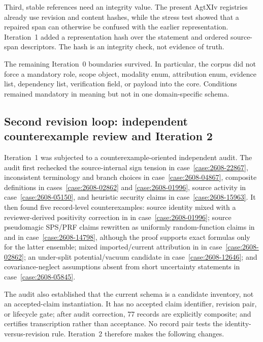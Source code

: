 Third, stable references need an integrity value. The present AgtXIv registries already use revision and content hashes, while the stress test showed that a repaired span can otherwise be confused with the earlier representation. Iteration~1 added a representation hash over the statement and ordered source-span descriptors. The hash is an integrity check, not evidence of truth.

The remaining Iteration~0 boundaries survived. In particular, the corpus did not force a mandatory role, scope object, modality enum, attribution enum, evidence list, dependency list, verification field, or \MathClaimIR{} payload into the core. Conditions remained mandatory in meaning but not in one domain-specific schema.

\subsection{Second revision loop: independent counterexample review and Iteration 2}

Iteration~1 was subjected to a counterexample-oriented independent audit. The audit first rechecked the source-internal sign tension in case~\ref{case:2608-22867}, inconsistent terminology and branch choices in case~\ref{case:2608-04867}, composite definitions in cases~\ref{case:2608-02862} and \ref{case:2608-01996}, source activity in case~\ref{case:2608-05150}, and heuristic security claims in case~\ref{case:2608-15963}. It then found five record-level counterexamples: source identity mixed with a reviewer-derived positivity correction in  in case~\ref{case:2608-01996}; source pseudomagic SPS/PRF claims rewritten as uniformly random-function claims in  and  in case~\ref{case:2608-14798}, although the proof supports exact formulas only for the latter ensemble; mixed imported/current attribution in  in case~\ref{case:2608-02862}; an under-split potential/vacuum candidate  in case~\ref{case:2608-12646}; and covariance-neglect assumptions absent from short uncertainty statements in case~\ref{case:2608-05845}.

The audit also established that the current schema is a candidate inventory, not an accepted-claim instantiation. It has no accepted claim identifier, revision pair, or lifecycle gate; after audit correction, 77 records are explicitly composite; and  certifies transcription rather than acceptance. No record pair tests the identity-versus-revision rule. Iteration~2 therefore makes the following changes.

